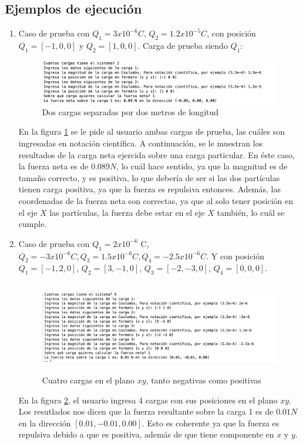 \documentclass[12pt, letterpaper]{report}
\begin{document}
\subsection*{Ejemplos de ejecución}
\begin{enumerate}
\item Caso de prueba con $Q_1 = 3x10^{-6} C$, $Q_2 = 1.2x10^{-5} C$, con posición $Q_1 = [-1, 0, 0]$ y $Q_2 = [1, 0, 0]$. Carga de prueba siendo $Q_1$: 
\begin{figure}[H]
    \centering
    \includegraphics[height = 3 cm]{2024-04-11_Prueba1SimuladorCoulomb_1.png}
    \caption{Dos cargas separadas por dos metros de longitud}
    \label{fig:fig_1}
\end{figure}
En la figura \ref{fig:fig_1} se le pide al usuario ambas cargas de prueba, las cuáles son ingresadas en notación científica. A continuación, se le muestran los 
resultados de la carga neta ejercida sobre una carga particular. En éste caso, la fuerza neta es de $0.089N$, lo cuál hace sentido, ya que la magnitud es de tamaño correcto, 
y es positiva, lo que debería de ser si las dos partículas tienen carga positiva, ya que la fuerza es repulsiva entonces. Además, las coordenadas de la fuerza neta son correctas, 
ya que al solo tener posición en el eje $X$ las partículas, la fuerza debe estar en el eje $X$ también, lo cuál se cumple. \\

\item Caso de prueba con $Q_1 = 2x10^{-6}$ C, $Q_2 =-3x10^{-6} C, Q_3 = 1.5x10^{-6} C, Q_4 = -2.5x10^{-6} C$. Y con posición $Q_1 = [-1, 2, 0]$, $Q_2 = [3, -1, 0]$, $Q_3 = [-2, -3, 0]$, $Q_4 = [0, 0, 0]$. 
\begin{figure}[H]
    \centering
    \includegraphics[height = 4cm]{2024-04-11_Prueba2SimuladorCoulomb.png}
    \caption{Cuatro cargas en el plano $xy$, tanto negativas como positivas}
    \label{fig:fig_2}
\end{figure}
En la figura \ref{fig:fig_2}, el usuario ingresa 4 cargas con sus posiciones en el plano $xy$. Los resutlados nos dicen que la fuerza resultante sobre 
la carga 1 es de $0.01N$ en la dirección $[0.01, -0.01, 0.00]$. Esto es coherente ya que la fuerza es repulsiva debido a que es positiva, además de que 
tiene componente en $x$ y $y$. 


\end{enumerate}
\end{document}
